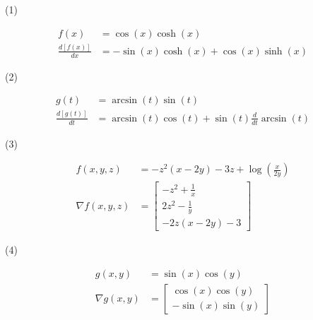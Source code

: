 \documentclass{article}
\begin{document}
(1)

\begin{align*}
	f{\left(x \right)} &= \cos{\left(x \right)} \cosh{\left(x \right)}\\
	\frac{d \left[ f(x) \right ] }{dx} &= - \sin{\left(x \right)} \cosh{\left(x \right)} + \cos{\left(x \right)} \sinh{\left(x \right)}
\end{align*}

(2)

\begin{align*}
	g{\left(t \right)} &= \arcsin{\left(t \right)} \sin{\left(t \right)}\\
	\frac{d \left[ g(t) \right ] }{dt} &= \arcsin{\left(t \right)} \cos{\left(t \right)} + \sin{\left(t \right)} \frac{d}{d t} \arcsin{\left(t \right)}
\end{align*}

(3)

\begin{align*}
	f{\left(x,y,z \right)} &= - z^{2} \left(x - 2 y\right) - 3 z + \log{\left(\frac{x}{2 y} \right)}\\
	\nabla f{\left(x,y,z \right)} &= \left[\begin{matrix}- z^{2} + \frac{1}{x}\\2 z^{2} - \frac{1}{y}\\- 2 z \left(x - 2 y\right) - 3\end{matrix}\right]
\end{align*}

(4)

\begin{align*}
	g{\left(x,y \right)} &= \sin{\left(x \right)} \cos{\left(y \right)}\\
	\nabla g{\left(x,y \right)} &= \left[\begin{matrix}\cos{\left(x \right)} \cos{\left(y \right)}\\- \sin{\left(x \right)} \sin{\left(y \right)}\end{matrix}\right]
\end{align*}
\end{document}
